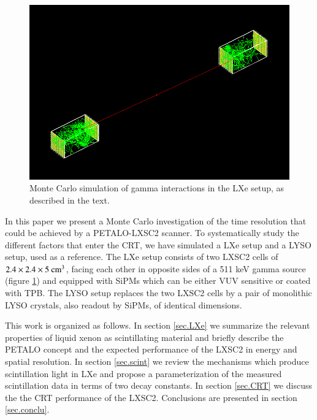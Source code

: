 \documentclass[review]{elsarticle}
\begin{document}
 \begin{figure}[!bthp]
	\centering
	\includegraphics[scale=0.4]{../img/PetaloSetup.png}
	\caption{\label{fig.psetup} Monte Carlo simulation of gamma interactions in the LXe setup, as 
	described in the text.}
\end{figure}

In this paper we present a Monte Carlo investigation of the time resolution
that could be achieved by a PETALO-LXSC2 scanner. To systematically study the different factors that enter the CRT, we have simulated a LXe setup and a LYSO setup, used as a reference. The LXe setup consists of two LXSC2 cells of 
$2.4 \times 2.4 \times 5 {\rm ~cm^3}$, facing each other in opposite sides of a 511 keV gamma source 
(figure \ref{fig.psetup}) and equipped with SiPMs which can be either VUV sensitive or coated with  TPB. The  LYSO setup replaces the two LXSC2 cells by a pair of  monolithic LYSO crystals, also readout by SiPMs, of identical dimensions.

This work is organized as follows. In section \ref{sec.LXe} we summarize the relevant properties of liquid xenon as scintillating material and briefly describe the PETALO concept and the expected performance of the LXSC2 in energy and spatial resolution. In section \ref{sec.scint} we review the mechanisms which produce scintillation light in LXe and propose a parameterization of the measured scintillation data in terms of two decay constants. In section \ref{sec.CRT} we discuss the the CRT performance of the LXSC2. Conclusions are presented in section \ref{sec.conclu}. 
\end{document}
